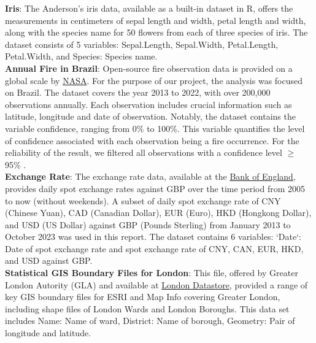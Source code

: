 \documentclass{article}\usepackage[]{graphicx}\usepackage[]{xcolor}
\begin{document}
\noindent
\textbf{Iris}: The Anderson's iris data, available as a built-in dataset in R, offers the measurements in centimeters of sepal length and width, petal length and width, along with the species name for 50 flowers from each of three species of iris. The dataset consists of 5 variables: Sepal.Length, Sepal.Width, Petal.Length, Petal.Width, and Species: Species name.\\

\noindent
\textbf{Annual Fire in Brazil}: Open-source fire observation data is provided on a global scale by \href{https://firms.modaps.eosdis.nasa.gov/}{NASA}. For the purpose of our project, the analysis was focused on Brazil. The dataset covers the year 2013 to 2022, with over 200,000 observations annually. Each observation includes crucial information such as latitude, longitude and date of observation. Notably, the dataset contains the variable confidence, ranging from 0\% to 100\%. This variable quantifies the level of confidence associated with each observation being a fire occurrence. For the reliability of the result, we filtered all observations with a confidence level $\ge$ 95\% \cite{nasa_confidence}.\\

\noindent
\textbf{Exchange Rate}: The exchange rate data, available at the \href{https://www.bankofengland.co.uk/boeapps/database/index.asp?first=yes&SectionRequired=I&HideNums=-1&ExtraInfo=true&Travel=NIx}{Bank of England}, provides daily spot exchange rates against GBP over the time period from 2005 to now (without weekends). A subset of daily spot exchange rate of CNY (Chinese Yuan), CAD (Canadian Dollar), EUR (Euro), HKD (Hongkong Dollar), and USD (US Dollar) against GBP (Pounds Sterling) from January 2013 to October 2023 was used in this report. The dataset contains 6 variables: `Date`: Date of spot exchange rate and spot exchange rate of CNY, CAN, EUR, HKD, and USD against GBP.\\

\noindent
\textbf{Statistical GIS Boundary Files for London}: This file, offered by Greater London Autority (GLA) and available at \href{https://data.london.gov.uk/dataset/statistical-gis-boundary-files-london}{London Datastore}, provided a range of key GIS boundary files for ESRI and Map Info covering Greater London, including shape files of London Wards and London Boroughs. This data set includes Name: Name of ward, District: Name of borough, Geometry: Pair of longitude and latitude.\\
\end{document}
